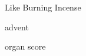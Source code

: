 \documentclass{lbi_organ_bind}
\begin{document}

\null\vfill
\begin{center}
  \huge
  
  Like Burning Incense

  \bigskip\LARGE advent

  \vfill\vfill\Large organ score

\end{center}


\newpage



\pagestyle{fancy}



\end{document}
